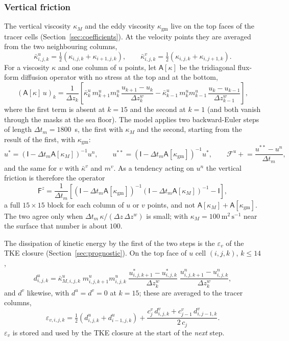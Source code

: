 \documentclass{article}
\begin{document}
\subsubsection*{Vertical friction}
The vertical viscosity $\kappa_{M}$ and the eddy viscosity $\kappa_\text{gm}$ live on the top faces of the tracer cells (Section~\ref{sec:coefficients}). At the velocity points they are averaged from the two neighbouring columns,
\[
\bar\kappa^u_{i,j,k} = \tfrac12\left( \kappa_{i,j,k} + \kappa_{i+1,j,k} \right), \qquad
\bar\kappa^v_{i,j,k} = \tfrac12\left( \kappa_{i,j,k} + \kappa_{i,j+1,k} \right).
\]
For a viscosity $\kappa$ and one column of $u$ points, let $\mathsf{A}[\kappa]$ be the tridiagonal flux-form diffusion operator with no stress at the top and at the bottom,
\[
\left( \mathsf{A}[\kappa]\,u \right)_k = \frac{1}{\Delta z_k}\left[ \bar\kappa^u_{k}\,m^u_{k+1}m^u_{k}\,\frac{u_{k+1} - u_k}{\Delta z^w_k} - \bar\kappa^u_{k-1}\,m^u_{k}m^u_{k-1}\,\frac{u_k - u_{k-1}}{\Delta z^w_{k-1}} \right],
\]
where the first term is absent at $k=15$ and the second at $k=1$ (and both vanish through the masks at the sea floor).
The model applies two backward-Euler steps of length $\Delta t_m = 1800$~s, the first with $\kappa_M$ and the second, starting from the result of the first, with $\kappa_\text{gm}$:
\[
u^\ast = \left( \mathsf{I} - \Delta t_m \mathsf{A}[\kappa_M] \right)^{-1} u^n,
\qquad
u^{\ast\ast} = \left( \mathsf{I} - \Delta t_m \mathsf{A}[\kappa_\text{gm}] \right)^{-1} u^\ast,
\qquad
\mathcal{F}^u \mathrel{+}= \frac{u^{\ast\ast} - u^n}{\Delta t_m},
\]
and the same for $v$ with $\bar\kappa^v$ and $m^v$.
As a tendency acting on $u^n$ the vertical friction is therefore the operator
\begin{equation}
\mathsf{F}^z = \frac{1}{\Delta t_m}\left[ \left( \mathsf{I} - \Delta t_m \mathsf{A}[\kappa_\text{gm}] \right)^{-1}\left( \mathsf{I} - \Delta t_m \mathsf{A}[\kappa_M] \right)^{-1} - \mathsf{I} \right],
\label{eq:Fz}
\end{equation}
a full $15\times15$ block for each column of $u$ or $v$ points, and not $\mathsf{A}[\kappa_M] + \mathsf{A}[\kappa_\text{gm}]$.
The two agree only when $\Delta t_m\,\kappa/(\Delta z\,\Delta z^w)$ is small; with $\kappa_M = 100~\text{m}^2\,\text{s}^{-1}$ near the surface that number is about $100$.

The dissipation of kinetic energy by the first of the two steps is the $\varepsilon_v$ of the TKE closure (Section~\ref{sec:prognostic}). On the top face of $u$ cell $(i,j,k)$, $k \le 14$,
\[
d^u_{i,j,k} = \bar\kappa^u_{M,i,j,k}\; m^u_{i,j,k+1}m^u_{i,j,k}\; \frac{u^\ast_{i,j,k+1} - u^\ast_{i,j,k}}{\Delta z^w_k}\; \frac{u^n_{i,j,k+1} - u^n_{i,j,k}}{\Delta z^w_k},
\]
and $d^v$ likewise, with $d^u = d^v = 0$ at $k = 15$; these are averaged to the tracer columns,
\begin{equation}
\varepsilon_{v,i,j,k} = \tfrac12\left( d^u_{i,j,k} + d^u_{i-1,j,k} \right) + \frac{c^v_j\, d^v_{i,j,k} + c^v_{j-1}\, d^v_{i,j-1,k}}{2\,c_j}.
\label{eq:epsv}
\end{equation}
$\varepsilon_v$ is stored and used by the TKE closure at the start of the \emph{next} step.
\end{document}
